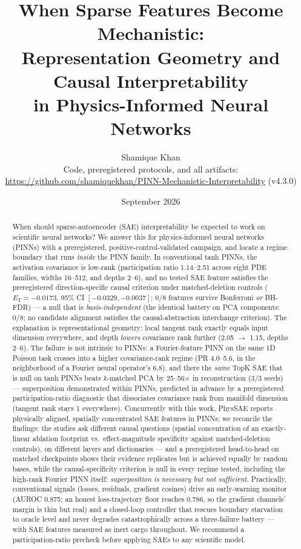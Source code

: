 \documentclass{article}
\title{When Sparse Features Become Mechanistic:\\ Representation Geometry and Causal Interpretability\\ in Physics-Informed Neural Networks}
\author{Shamique Khan\\
\small Code, preregistered protocols, and all artifacts:\\
\small \url{https://github.com/shamiquekhan/PINN-Mechanistic-Interpretability} (v4.3.0)}
\date{September 2026}
\newcommand{\ET}{E_T}
\begin{document}
\maketitle

\begin{abstract}
When should sparse-autoencoder (SAE) interpretability be expected to work on
scientific neural networks? We answer this for physics-informed neural
networks (PINNs) with a preregistered, positive-control-validated campaign,
and locate a regime boundary that runs \emph{inside} the PINN family. In
conventional tanh PINNs, the activation covariance is low-rank (participation
ratio 1.14--2.51 across eight PDE families, widths 16--512, and depths
2--6), and no tested SAE feature satisfies the preregistered
direction-specific causal criterion under matched-deletion
controls ($\ET=-0.0173$, 95\% CI $[-0.0329,-0.0037]$; 0/8 features survive
Bonferroni \emph{or} BH-FDR) --- a null that is \emph{basis-independent}
(the identical battery on PCA components: 0/8; no candidate alignment
satisfies the causal-abstraction interchange criterion). The explanation is
representational geometry: local tangent rank exactly equals input dimension
everywhere, and depth \emph{lowers} covariance rank further (2.05 $\to$ 1.15,
depths 2--6). The failure is not intrinsic to PINNs: a Fourier-feature PINN
on the same 1D Poisson task crosses into a higher covariance-rank regime
(PR 4.0--5.6, in the neighborhood of a Fourier neural operator's 6.8), and
there the \emph{same} TopK SAE that is null on tanh PINNs beats $k$-matched
PCA by 25--56$\times$ in reconstruction (3/3 seeds) --- superposition
demonstrated within PINNs, predicted in advance by a preregistered
participation-ratio diagnostic that dissociates covariance rank from
manifold dimension (tangent rank stays 1 everywhere). Concurrently with this
work, PhysSAE reports physically aligned, spatially concentrated SAE
features in PINNs; we reconcile the findings: the studies ask different
causal questions (spatial concentration of an exactly-linear ablation
footprint vs.\ effect-magnitude specificity against matched-deletion
controls), on different layers and dictionaries --- and a preregistered
head-to-head on matched checkpoints shows their evidence replicates but
is achieved equally by random bases, while the causal-specificity
criterion is null in every regime tested, including the high-rank
Fourier PINN itself: \emph{superposition is necessary but not
sufficient}. Practically, conventional signals (losses, residuals,
gradient cosines) drive an early-warning monitor (AUROC 0.875; an
honest loss-trajectory floor reaches 0.786, so the gradient channels'
margin is thin but real) and a closed-loop controller that rescues
boundary
starvation to oracle level and never degrades catastrophically across a
three-failure battery --- with SAE features measured as inert cargo
throughout. We recommend a participation-ratio precheck before applying
SAEs to any scientific model.
\end{abstract}
\end{document}
